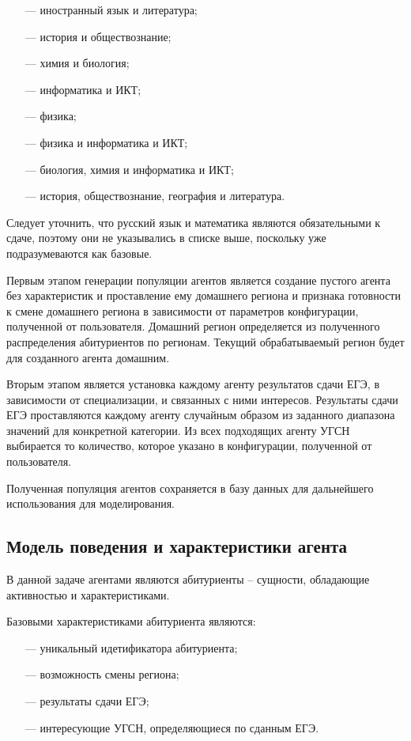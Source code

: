 \begin{itemize}[leftmargin=1.6\parindent]
	\item[---] иностранный язык и литература;
	\item[---] история и обществознание;
	\item[---] химия и биология;
	\item[---] информатика и ИКТ;
	\item[---] физика;
	\item[---] физика и информатика и ИКТ;
	\item[---] биология, химия и информатика и ИКТ;
	\item[---] история, обществознание, география и литература.
\end{itemize}

Следует уточнить, что русский язык и математика являются обязательными к сдаче, поэтому они не указывались в списке выше, поскольку уже подразумеваются как базовые.

Первым этапом генерации популяции агентов является создание пустого агента без характеристик и проставление ему домашнего региона и признака готовности к смене домашнего региона в зависимости от параметров конфигурации, полученной от пользователя. Домашний регион определяется из полученного распределения абитуриентов по регионам. Текущий обрабатываемый регион будет для созданного агента домашним.

Вторым этапом является установка каждому агенту результатов сдачи ЕГЭ, в зависимости от специализации, и связанных с ними интересов. Результаты сдачи ЕГЭ проставляются каждому агенту случайным образом из заданного диапазона значений для конкретной категории. Из всех подходящих агенту УГСН выбирается то количество, которое указано в конфигурации, полученной от пользователя.

Полученная популяция агентов сохраняется в базу данных для дальнейшего использования для моделирования.

\subsection{Модель поведения и характеристики агента}

В данной задаче агентами являются абитуриенты – сущности, обладающие активностью и характеристиками.

Базовыми характеристиками абитуриента являются:

\begin{itemize}[leftmargin=1.6\parindent]
	\item[---] уникальный идетификатора абитуриента;
	\item[---] возможность смены региона;
	\item[---] результаты сдачи ЕГЭ;
	\item[---] интересующие УГСН, определяющиеся по сданным ЕГЭ.

\end{itemize}

